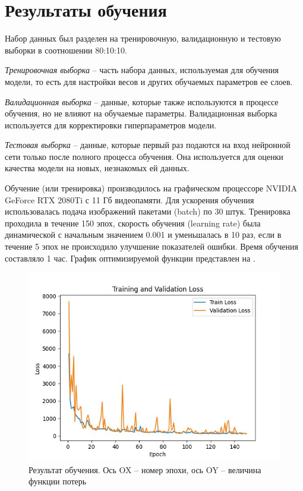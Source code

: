 \section{Результаты обучения} \label{ch3:sec2}
Набор данных был разделен на тренировочную, валидационную и тестовую выборки в соотношении 80:10:10.

\textit{Тренировочная выборка} -- часть набора данных, используемая для обучения модели, то есть для настройки весов и других обучаемых параметров ее слоев.

\textit{Валидационная выборка} -- данные, которые также используются в процессе обучения, но не влияют на обучаемые параметры. Валидационная выборка используется для корректировки гиперпараметров модели.

\textit{Тестовая выборка} -- данные, которые первый раз подаются на вход нейронной сети только после полного процесса обучения. Она используется для оценки качества модели на новых, незнакомых ей данных.

Обучение (или тренировка) производилось на графическом процессоре NVIDIA GeForce RTX 2080Ti с 11 Гб видеопамяти. Для ускорения обучения использовалась подача изображений пакетами (batch) по 30 штук. Тренировка проходила в течение 150 эпох, скорость обучения (learning rate) была динамической с начальным значением 0.001 и уменьшалась в 10 раз, если в течение 5 эпох не происходило улучшение показателей ошибки. Время обучения составляло 1 час. График оптимизируемой функции представлен на . 

\begin{figure}[ht] 
	\center
	\includegraphics [scale=1.0] {my_folder/images/loss_150_epochs.jpg}
	\caption{Результат обучения. Ось OX -- номер эпохи, ось OY -- величина функции потерь}
	\label{fig:loss}
\end{figure}

